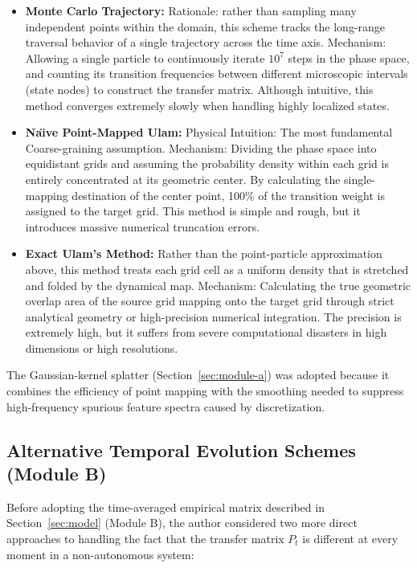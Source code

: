 \documentclass[mca,article,submit,oneauthor,pdftex]{Definitions/mdpi}
\begin{document}
\begin{itemize}
\item
  \textbf{Monte Carlo Trajectory:} Rationale: rather than sampling many
  independent points within the domain, this scheme tracks the
  long-range traversal behavior of a single trajectory across the time
  axis. Mechanism: Allowing a single particle to continuously iterate
  \(\text{10}^{\text{7}}\) steps in the phase space, and counting its
  transition frequencies between different microscopic intervals (state
  nodes) to construct the transfer matrix. Although intuitive, this
  method converges extremely slowly when handling highly localized
  states.
\item
  \textbf{Na\"\i{}ve Point-Mapped Ulam:} Physical Intuition: The most
  fundamental Coarse-graining assumption. Mechanism: Dividing the phase
  space into equidistant grids and assuming the probability density
  within each grid is entirely concentrated at its geometric center. By
  calculating the single-mapping destination of the center point, 100\%
  of the transition weight is assigned to the target grid. This method
  is simple and rough, but it introduces massive numerical truncation
  errors.
\item
  \textbf{Exact Ulam's Method:} Rather than the
  point-particle approximation above, this method treats each grid cell as
  a uniform density that is stretched and folded by the dynamical map.
  Mechanism:
  Calculating the true geometric overlap area of the source grid mapping
  onto the target grid through strict analytical geometry or
  high-precision numerical integration. The precision is extremely high,
  but it suffers from severe computational disasters in high dimensions
  or high resolutions.
\end{itemize}

The Gaussian-kernel splatter (Section~\ref{sec:module-a}) was adopted because
it combines the efficiency of point mapping with the smoothing needed to
suppress high-frequency spurious feature spectra caused by discretization.

\subsection{Alternative Temporal Evolution Schemes (Module B)}\label{sec:module-b-alternatives}

Before adopting the time-averaged empirical matrix described in
Section~\ref{sec:model} (Module B), the author considered two more direct
approaches to handling the fact that the transfer matrix $P_t$ is different
at every moment in a non-autonomous system:
\end{document}
